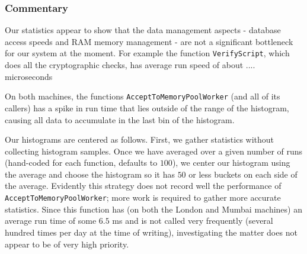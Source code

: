 \documentclass{article}
\begin{document}
\subsubsection{Commentary}
Our statistics appear to show that the data management aspects - database access speeds and RAM memory management - are not a significant bottleneck for our system at the moment. For example the function \verb|VerifyScript|, which does all the cryptographic checks, has average run speed of about .... microseconds



On both machines, the functions \verb|AcceptToMemoryPoolWorker| (and all of its callers) has a spike in run time that lies outside of the range of the histogram, causing all data to accumulate in the last bin of the histogram.

Our histograms are centered as follows. First, we gather statistics without collecting histogram samples. Once we have averaged over a given number of runs (hand-coded for each function, defaults to $100$), we center our histogram using the average and choose the histogram so it has $50$ or less buckets on each side of the average. Evidently this strategy does not record well the performance of  \verb|AcceptToMemoryPoolWorker|; more work is required to gather more accurate statistics. Since this function has (on both the London and Mumbai machines) an average run time of some $6.5$ ms and is not called very frequently (several hundred times per day at the time of writing), investigating the matter does not appear to be of very high priority. 
\end{document}

